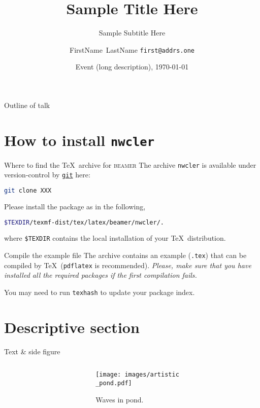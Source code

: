 \documentclass[aspectratio=169,11pt]{beamer}
\title{Sample Title Here}
\subtitle{Sample Subtitle Here}
\date[Event-short-name]{Event (long description), \today}
\author[authors-in-short]{
  FirstName~LastName\inst{1} \texttt{first@addrs.one}
}
\institute[NWCL]{
  \inst{1} \newcleo\ SrL, Via Giuseppe Galliano 27, 10129 Torino, Italy
}
\newcommand{\examplefile}{\jobname.tex}
\begin{document}
\begin{frame}
  \titlepage
\end{frame}

\begin{frame}{Outline of talk}
  \tableofcontents
\end{frame}

\section{How to install \texttt{nwcler}}

\begin{frame}[fragile]{\insertsection}
\begin{block}{Where to find the \TeX\ archive for \textsc{beamer}}
  \small
  The archive \texttt{nwcler} is available under version-control by
  \href{https://git-scm.com/}{\texttt{git}} here:
  \begin{lstlisting}[language=bash]
    git clone XXX
  \end{lstlisting}
  Please install the package as in the following,
  \begin{lstlisting}[language=bash]
  $TEXDIR/texmf-dist/tex/latex/beamer/nwcler/.
  \end{lstlisting}
  where \lstinline|$TEXDIR| contains the local installation of your
  \TeX\ distribution.
\end{block}
\begin{exampleblock}{Compile the example file}
  \small
  The archive contains an example (\texttt{\examplefile})
  that can be compiled by \TeX\ (\texttt{pdflatex} is recommended).
  \emph{Please, make sure that you have installed all the required
  packages if the first compilation fails.}
\end{exampleblock}
\begin{center}
\alert<2>{You may need to run \texttt{texhash} to update your
package index.}
\end{center}
\end{frame}

\section{Descriptive section}

\begin{frame}{Text \& side figure}

\begin{columns}
\begin{column}{0.58\textwidth}
  \scriptsize
  \lipsum[1]
\end{column}
\hfill
\begin{column}{0.4\textwidth}
  \begin{figure}
    \centering
    \texttt{[image: images/artistic\\\_pond.pdf]}
    \caption{Waves in pond.}
    \label{fig:artpond}
  \end{figure}
\end{column}
\end{columns}
\end{frame}
\end{document}
